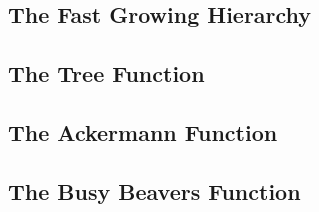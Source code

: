 \subsection{The Fast Growing Hierarchy}



\subsection{The Tree Function}

\subsection{The Ackermann Function}



\subsection{The Busy Beavers Function}







